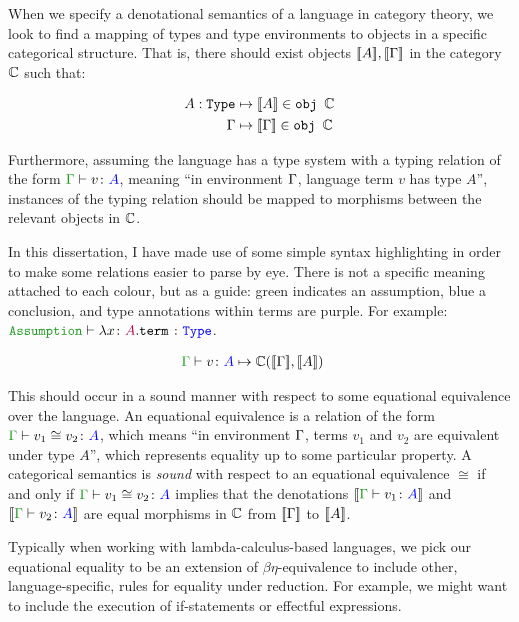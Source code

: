 When we specify a denotational semantics of a language in category theory, we look to find a mapping of types and type environments to objects in a specific categorical structure.  That is, there should exist objects ${\bf [\![}A{\bf ]\!]}, {\bf [\![}\Gamma{\bf ]\!]}$ in the category $\mathbb{C}$ such that:

\begin{align*}
    A: \texttt{Type} & \mapsto {\bf [\![}A{\bf ]\!]} \in \texttt{obj } \mathbb{C} \\
    \Gamma & \mapsto  {\bf [\![}\Gamma{\bf ]\!]} \in \texttt{obj } \mathbb{C}
\end{align*}

Furthermore, assuming the language has a type system with a typing relation of the form $\gtyperelation{v}{A}$, meaning ``in environment $\Gamma$, language term $v$ has type $A$'', instances of the typing relation should be mapped to morphisms between the relevant objects in $\mathbb{C}$.

\begin{framed}
    \begin{aside}
        In this dissertation, I have made use of some simple syntax highlighting in order to make some relations easier to parse by eye. There is not a specific meaning attached to each colour, but as a guide: green indicates an assumption, blue a conclusion, and type annotations within terms are purple. For example: $\typerelation{\texttt{Assumption}}{\lam{x}{A}{\texttt{term}}}{\texttt{Type}}$.
    \end{aside}
     
\end{framed}

\begin{align*}
    \gtyperelation{v}{A} & \mapsto \C(\deno{\G}, \deno{A}) 
\end{align*}

This should occur in a sound manner with respect to some equational equivalence over the language. An equational equivalence is a relation of the form $\gtyperelation{v_1 \cong v_2}{A}$, which means ``in environment $\Gamma$, terms $v_1$ and $v_2$ are equivalent under type $A$'', which represents equality up to some particular property. A categorical semantics is \textit{sound} with respect to an equational equivalence $\cong$ if and only if $\gtyperelation{v_1 \cong v_2}{A}$ implies that the denotations $\deno{\gtyperelation{v_1}{A}}$ and $\deno{\gtyperelation{v_2}{A}}$ are equal morphisms in $\mathbb{C}$ from ${\bf [\![}\Gamma{\bf ]\!]}$ to ${\bf [\![}A{\bf ]\!]}$.

Typically when working with lambda-calculus-based languages, we pick our equational equality to be an extension of $\beta\eta$-equivalence to include other, language-specific, rules for equality under reduction. For example, we might want to include the execution of if-statements or effectful expressions.

